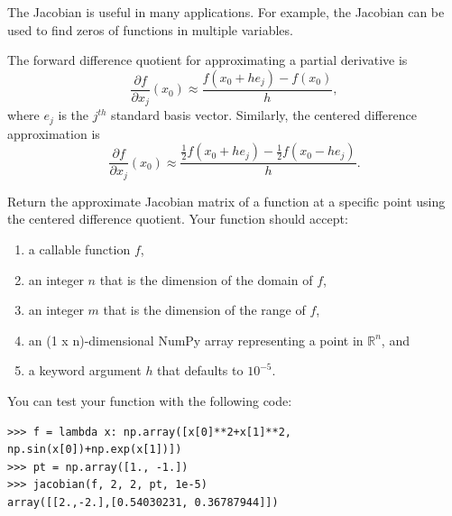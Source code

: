The Jacobian is useful in many applications.  For example, the Jacobian can be used to find zeros of functions in multiple variables.

The forward difference quotient for approximating a partial derivative is
\begin{equation*}
\frac{\partial f}{\partial x_j} (x_0) \approx \frac{f(x_0+h e_j)-f(x_0)}{h},
\end{equation*}
where $e_j$ is the $j^{th}$ standard basis vector.
Similarly, the centered difference approximation is
\begin{equation*}
\frac{\partial f}{\partial x_j} (x_0) \approx \frac{\frac{1}{2}f(x_0+h e_j)-\frac{1}{2}f(x_0-h e_j)}{h}.
\end{equation*}

\begin{problem}
\leavevmode
Return the approximate Jacobian matrix of a function at a specific point using the centered difference quotient.
Your function should accept:
\begin{enumerate}
\item a callable function $f$,
\item an integer $n$ that is the dimension of the domain of $f$,
\item an integer $m$ that is the dimension of the range of $f$,
\item an (1 x n)-dimensional NumPy array  representing a point in $\mathbb{R}^n$, and
\item a keyword argument $h$ that defaults to $10^{-5}$.
\end{enumerate}

You can test your function with the following code:
\begin{lstlisting}
>>> f = lambda x: np.array([x[0]**2+x[1]**2, np.sin(x[0])+np.exp(x[1])])
>>> pt = np.array([1., -1.])
>>> jacobian(f, 2, 2, pt, 1e-5)
array([[2.,-2.],[0.54030231, 0.36787944]])
\end{lstlisting}
\end{problem}
